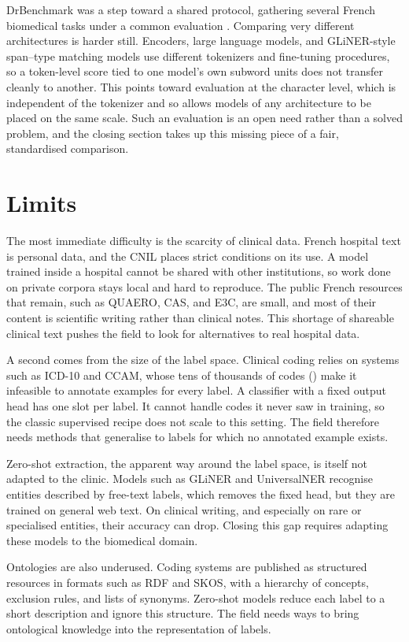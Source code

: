 DrBenchmark was a step toward a shared protocol, gathering several French biomedical tasks under
a common evaluation \citep{drbenchmark2024}. Comparing very different architectures is
harder still. Encoders, large language models, and GLiNER-style span--type matching models use
different tokenizers and fine-tuning procedures, so a token-level score tied to one model's own
subword units does not transfer cleanly to another. This points toward
evaluation at the character level, which is independent of the tokenizer and so allows models
of any architecture to be placed on the same scale. Such an evaluation is an open need rather
than a solved problem, and the closing section takes up this missing piece of a fair,
standardised comparison.
\section{Limits}
\label{sec:ie-limitations}

The most immediate difficulty is the scarcity of clinical data. French hospital text is personal data,
and the CNIL places strict conditions on its use. A model trained inside a hospital cannot be
shared with other institutions, so work done on private corpora stays local and hard to
reproduce. The public French resources that remain, such as QUAERO, CAS, and E3C, are small,
and most of their content is scientific writing rather than clinical notes. This shortage of
shareable clinical text pushes the field to look for alternatives to real hospital data.

A second comes from the size of the label space. Clinical coding relies on systems such as
ICD-10 and CCAM, whose tens of thousands of codes () make it infeasible to
annotate examples for every label. A classifier with a fixed output head has one slot per label.
It cannot handle codes it never saw in training, so the classic supervised recipe does not scale
to this setting. The field therefore needs methods that generalise to labels for which no
annotated example exists.

Zero-shot extraction, the apparent way around the label space, is itself not adapted to the
clinic. Models such as
GLiNER and UniversalNER recognise entities described by free-text labels, which removes the
fixed head, but they are trained on general web text. On clinical writing, and especially on
rare or specialised entities, their accuracy can drop. Closing this gap requires adapting these
models to the biomedical domain.

Ontologies are also underused. Coding systems are published as
structured resources in formats such as RDF and SKOS, with a hierarchy of concepts, exclusion
rules, and lists of synonyms. Zero-shot models reduce each label to a short description and
ignore this structure. The field needs ways to bring ontological knowledge into the
representation of labels.


